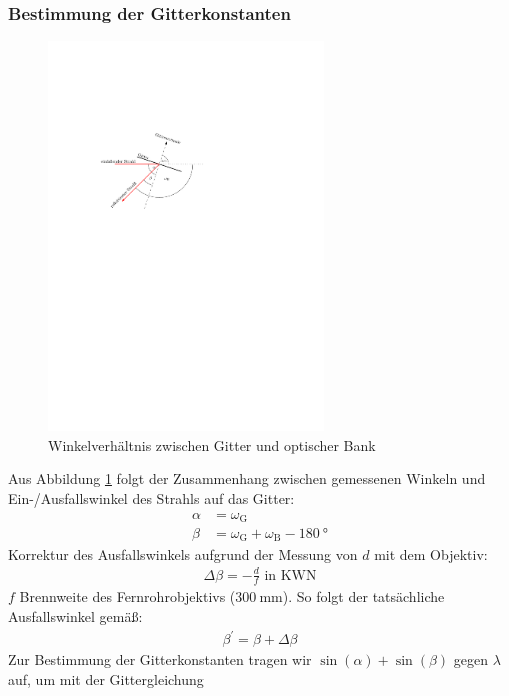 \documentclass[11pt, a4paper]{article}
\numberwithin{equation}{section}
\begin{document}
\subsubsection{Bestimmung der Gitterkonstanten}
\begin{figure}[h]
	\centering
	\includegraphics[width=0.65\textwidth]{./figures/winkelverhaeltniss.pdf}
	\caption{Winkelverhältnis zwischen Gitter und optischer Bank}
	\label{fig:winkelverhaeltnis}
\end{figure}
Aus Abbildung \ref{fig:winkelverhaeltnis} folgt der Zusammenhang zwischen gemessenen Winkeln und Ein-/Ausfallswinkel des Strahls auf das Gitter: 
\begin{align*}
	\alpha &= \omega_\text{G} \\
	\beta &= \omega_\text{G} + \omega_\text{B} - \SI{180}{\degree}
	\label{eq:reflexionswinkel}
\end{align*}
Korrektur des Ausfallswinkels aufgrund der Messung von $d$ mit dem Objektiv:
\begin{align*}
\Delta \beta = -\frac{d}{f} \text{ in KWN}
\end{align*}
$f$ Brennweite des Fernrohrobjektivs ($\SI{300}{\milli\metre}$).
So folgt der tatsächliche Ausfallswinkel gemäß:
\begin{align*}
	\beta^\prime = \beta + \Delta \beta
\end{align*}
Zur Bestimmung der Gitterkonstanten tragen wir $\sin(\alpha) + \sin(\beta)$ gegen $\lambda$ auf, um mit der Gittergleichung
\end{document}
